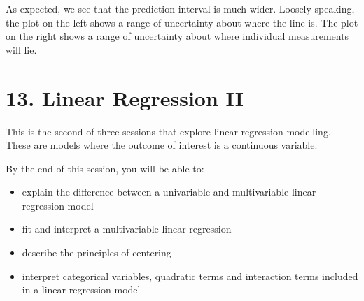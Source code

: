 \documentclass[letterpaper,10pt,english]{jupyterBook}
\begin{document}
\begin{sphinxVerbatim}[commandchars=\\\{\}]
   
 \PYG{p}{[}\PYG{p}{]} 
 \PYG{p}{[}\PYG{p}{]} 
\end{sphinxVerbatim}

\noindent{}

\sphinxAtStartPar
As expected, we see that the prediction interval is much wider. Loosely speaking, the plot on the left shows a range of uncertainty about where the  line is. The plot on the right shows a range of uncertainty about where individual measurements will lie.


\chapter{13. Linear Regression II}
\label{\detokenize{13.a. Linear Regression II:linear-regression-ii}}\label{\detokenize{13.a. Linear Regression II::doc}}
\sphinxAtStartPar
This is the second of three sessions that explore linear regression modelling. These are models where the outcome of interest is a continuous variable.



\sphinxAtStartPar
By the end of this session, you will be able to:
\begin{itemize}
\item {} 
\sphinxAtStartPar
explain the difference between a univariable and multivariable linear regression model

\item {} 
\sphinxAtStartPar
fit and interpret a multivariable linear regression

\item {} 
\sphinxAtStartPar
describe the principles of centering

\item {} 
\sphinxAtStartPar
interpret categorical variables, quadratic terms and interaction terms included in a linear regression model

\end{itemize}
\end{document}
